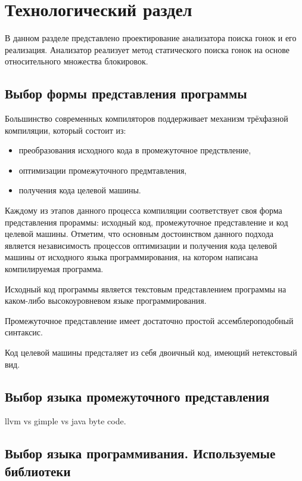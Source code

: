 \chapter{Технологический раздел}
\label{cha:impl}

В данном разделе представлено проектирование анализатора поиска гонок и его реализация. Анализатор реализует метод статического поиска гонок на основе относительного множества блокировок.

\section{Выбор формы представления программы}

Большинство современных компиляторов поддерживает механизм трёхфазной компиляции, который состоит из:
\begin{itemize}
  \item преобразования исходного кода в промежуточное предствление,
  \item оптимизации промежуточного предмтавления,
  \item получения кода целевой машины.
\end{itemize}
Каждому из этапов данного процесса компиляции соответствует своя форма представления прораммы: исходный код, промежуточное представление и код целевой машины. Отметим, что основным достоинством данного подхода является независимость процессов оптимизации и получения кода целевой машины от исходного языка программирования, на котором написана компилируемая программа. 

Исходный код программы является текстовым представлением программы на каком-либо высокоуровневом языке программирования.

Промежуточное представление имеет достаточно простой ассемблероподобный синтаксис.

Код целевой машины предсталяет из себя двоичный код, имеющий нетекстовый вид.

\section{Выбор языка промежуточного представления}

llvm vs gimple vs java byte code.


\section{Выбор языка программивания. Используемые библиотеки}

